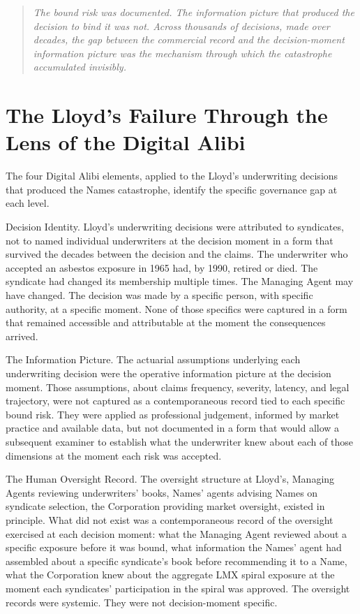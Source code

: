 \begin{quote}
\emph{The bound risk was documented. The information picture that produced the decision to bind it was not. Across thousands of decisions, made over decades, the gap between the commercial record and the decision-moment information picture was the mechanism through which the catastrophe accumulated invisibly.}
\end{quote}

\scenebreak

\section{The Lloyd's Failure Through the Lens of the Digital Alibi}

The four Digital Alibi elements, applied to the Lloyd's underwriting decisions that produced the Names catastrophe, identify the specific governance gap at each level.

Decision Identity. Lloyd's underwriting decisions were attributed to syndicates, not to named individual underwriters at the decision moment in a form that survived the decades between the decision and the claims. The underwriter who accepted an asbestos exposure in 1965 had, by 1990, retired or died. The syndicate had changed its membership multiple times. The Managing Agent may have changed. The decision was made by a specific person, with specific authority, at a specific moment. None of those specifics were captured in a form that remained accessible and attributable at the moment the consequences arrived.

The Information Picture. The actuarial assumptions underlying each underwriting decision were the operative information picture at the decision moment. Those assumptions, about claims frequency, severity, latency, and legal trajectory, were not captured as a contemporaneous record tied to each specific bound risk. They were applied as professional judgement, informed by market practice and available data, but not documented in a form that would allow a subsequent examiner to establish what the underwriter knew about each of those dimensions at the moment each risk was accepted.

The Human Oversight Record. The oversight structure at Lloyd's, Managing Agents reviewing underwriters' books, Names' agents advising Names on syndicate selection, the Corporation providing market oversight, existed in principle. What did not exist was a contemporaneous record of the oversight exercised at each decision moment: what the Managing Agent reviewed about a specific exposure before it was bound, what information the Names' agent had assembled about a specific syndicate's book before recommending it to a Name, what the Corporation knew about the aggregate LMX spiral exposure at the moment each syndicates' participation in the spiral was approved. The oversight records were systemic. They were not decision-moment specific.

